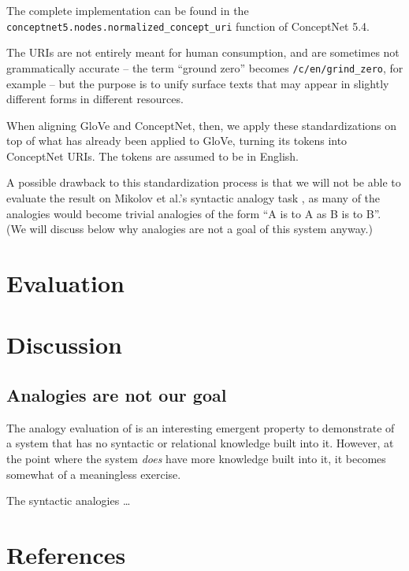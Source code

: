 \documentclass[letterpaper]{article}
\begin{document}
The complete implementation can be found in the
{\tt conceptnet5.nodes.normalized\_concept\_uri} function of ConceptNet 5.4.

The URIs are not entirely meant for human consumption, and are
sometimes not grammatically accurate -- the term ``ground zero'' becomes
{\tt /c/en/grind\_zero}, for example -- but the purpose is to unify
surface texts that may appear in slightly different forms in different
resources.

When aligning GloVe and ConceptNet, then, we apply these standardizations on
top of what has already been applied to GloVe, turning its tokens into
ConceptNet URIs. The tokens are assumed to be in English.

A possible drawback to this standardization process is that we will not be able
to evaluate the result on Mikolov et al.'s syntactic analogy task
\cite{mikolov2013word2vec}, as many of the analogies would become trivial
analogies of the form ``A is to A as B is to B''. (We will discuss below
why analogies are not a goal of this system anyway.)

\section{Evaluation}



\section{Discussion}

\subsection{Analogies are not our goal}
\label{analogies-meh}

The analogy evaluation of \cite{mikolov2013word2vec} is an interesting
emergent property to demonstrate of a system that has no syntactic or
relational knowledge built into it. However, at the point where the system
{\em does} have more knowledge built into it, it becomes somewhat of
a meaningless exercise.

The syntactic analogies \ldots

\section{References}

\end{document}
